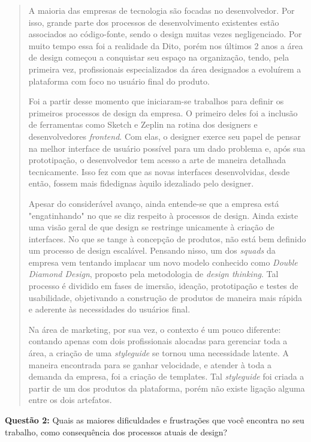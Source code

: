 \begin{quote}
    A maioria das empresas de tecnologia são focadas no desenvolvedor. Por isso, grande parte dos processos de desenvolvimento existentes estão associados ao código-fonte, sendo o design muitas vezes negligenciado. Por muito tempo essa foi a realidade da Dito, porém nos últimos 2 anos a área de design começou a conquistar seu espaço na organização, tendo, pela primeira vez, profissionais especializados da área designados a evoluírem a plataforma com foco no usuário final do produto.
    
    Foi a partir desse momento que iniciaram-se trabalhos para definir os primeiros processos de design da empresa. O primeiro deles foi a inclusão de ferramentas como Sketch e Zeplin na rotina dos designers e desenvolvedores \textit{frontend}. Com elas, o designer exerce seu papel de pensar na melhor interface de usuário possível para um dado problema e, após sua prototipação, o desenvolvedor tem acesso a arte de maneira detalhada tecnicamente. Isso fez com que as novas interfaces desenvolvidas, desde então, fossem mais fidedignas àquilo idezaliado pelo designer.
    
    Apesar do considerável avanço, ainda entende-se que a empresa está "engatinhando" no que se diz respeito à processos de design. Ainda existe uma visão geral de que design se restringe unicamente à criação de interfaces. No que se tange à concepção de produtos, não está bem definido um processo de design escalável. Pensando nisso, um dos \textit{squads} da empresa vem tentando implacar um novo modelo conhecido como \textit{Double Diamond Design}, proposto pela metodologia de \textit{design thinking}. Tal processo é dividido em fases de imersão, ideação, prototipação e testes de usabilidade, objetivando a construção de produtos de maneira mais rápida e aderente às necessidades do usuários final.
    
    Na área de marketing, por sua vez, o contexto é um pouco diferente: contando apenas com dois profissionais alocadas para gerenciar toda a área, a criação de uma \textit{styleguide} se tornou uma necessidade latente. A maneira encontrada para se ganhar velocidade, e atender à toda a demanda da empresa, foi a criação de templates. Tal \textit{styleguide} foi criada a partir de um dos produtos da plataforma, porém não existe ligação alguma entre os dois artefatos.
\end{quote}

\textbf{Questão 2:} Quais as maiores dificuldades e frustrações que você encontra no seu trabalho, como consequência dos processos atuais de design?

